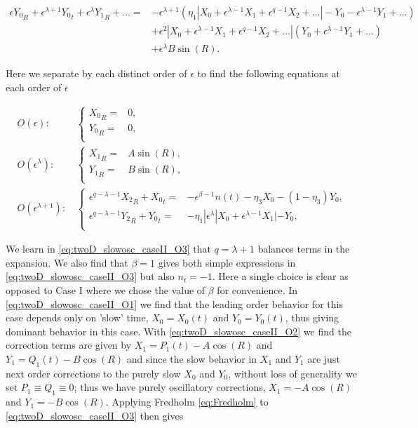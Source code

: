 \begin{equation*}
\begin{aligned}
\epsilon {Y_0}_R+\epsilon^{\lambda+1}{Y_0}_t+\epsilon^\lambda {Y_1}_R+\ldots=& -\epsilon^{\lambda+1}(\eta_1|X_0 +\epsilon^{\lambda-1} X_1+\epsilon^{q-1} X_2+\ldots|- Y_0-\epsilon^{\lambda-1} Y_1+\ldots)\\
&+\epsilon^2|X_0 +\epsilon^{\lambda-1} X_1+\epsilon^{q-1} X_2+\ldots|(Y_0 +\epsilon^{\lambda-1} Y_1+\ldots)\\
&+\epsilon^\lambda B \sin (R).
\end{aligned}
\end{equation*}

Here we separate by each distinct order of $\epsilon$ to find the following equations at each order of $\epsilon$

\begin{align} \label{eq:twoD_slowosc_caseII_O1}
O(\epsilon):\, &\begin{cases}
	{X_0}_R =& 0, \\
	{Y_0}_R =& 0,\\
\end{cases}\\ \label{eq:twoD_slowosc_caseII_O2}
O(\epsilon^\lambda): \, & \begin{cases}
	{X_1}_R =& A\sin(R), \\
	{Y_1}_R =& B\sin(R),\\
\end{cases}\\
\label{eq:twoD_slowosc_caseII_O3}
O(\epsilon^{\lambda+1}):\, &\begin{cases}
	\epsilon^{q-\lambda-1}{X_2}_R+{X_0}_t =& -\epsilon^{\beta-1}n(t)-\eta_3X_0-(1-\eta_3)Y_0, \\
	\epsilon^{q-\lambda-1}{Y_2}_R+{Y_0}_t =& -\eta_1|\epsilon^{\lambda}|X_0+\epsilon^{\lambda-1}X_1|-Y_0,\\
\end{cases}
\end{align}

We learn in \eqref{eq:twoD_slowosc_caseII_O3} that $q=\lambda+1$ balances terms in the expansion. We also find that $\beta =1$ gives both simple expressions in \eqref{eq:twoD_slowosc_caseII_O3} but also $n_t=-1$. Here a single choice is clear as opposed to Case I where we chose the value of $\beta$ for convenience. In \eqref{eq:twoD_slowosc_caseII_O1} we find that the leading order behavior for this case depends only on 'slow' time, $X_0=X_0(t)$ and $Y_0=Y_0(t)$, thus giving dominant behavior in this case. With \eqref{eq:twoD_slowosc_caseII_O2} we find the correction terms are given by $X_1=P_1(t)-A\cos(R)$ and $Y_1=Q_1(t)-B\cos(R)$ and since the slow behavior in $X_1$ and $Y_1$ are just next order corrections to the purely slow $X_0$ and $Y_0$, without loss of generality we set $P_1\equiv Q_1\equiv 0$; thus we have purely oscillatory corrections, $X_1=-A\cos(R)$ and $Y_1=-B\cos(R)$. Applying Fredholm \eqref{eq:Fredholm} to \eqref{eq:twoD_slowosc_caseII_O3} then gives

